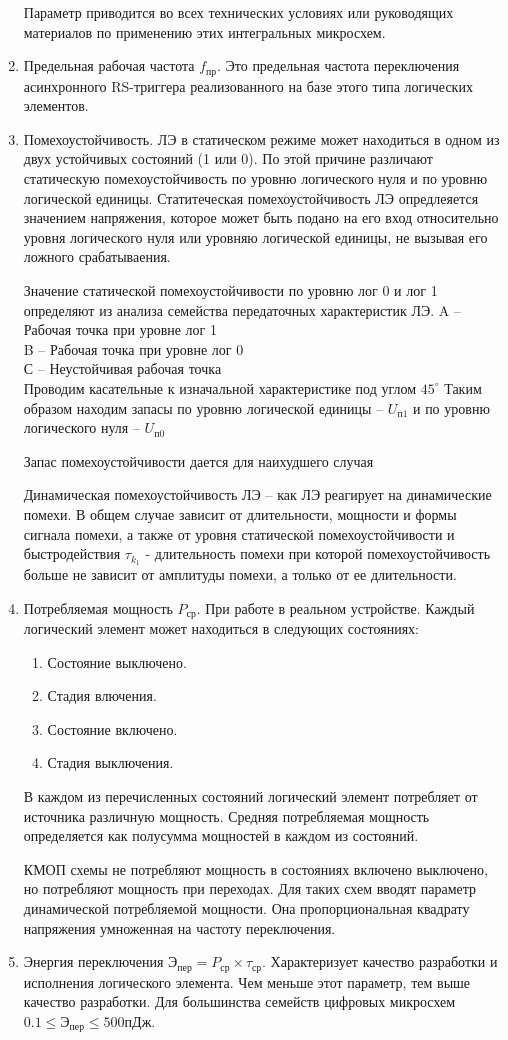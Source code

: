 \documentclass{article}
\begin{document}
\begin{enumerate}
	Параметр приводится во всех технических условиях или руководящих материалов по применению этих интегральных микросхем.
	\item Предельная рабочая частота $f_{пр}$. Это предельная частота переключения асинхронного RS-триггера реализованного на базе этого типа логических
	элементов. 
	\item Помехоустойчивость.
	ЛЭ в статическом режиме может находиться в одном из двух устойчивых состояний (1 или 0). По этой причине различают статическую помехоустойчивость по уровню логического нуля
	и по уровню логической единицы. Статитеческая помехоустойчивость ЛЭ опредлеяется значением напряжения, которое может быть подано на его вход относительно уровня логического
	нуля или уровняю логической единицы, не вызывая его ложного срабатываения.

	Значение статической помехоустойчивости по уровню лог 0 и лог 1 определяют из анализа семейства передаточных характеристик ЛЭ.
	A -- Рабочая точка при уровне лог 1\\
	B -- Рабочая точка при уровне лог 0\\
	С -- Неустойчивая рабочая точка\\
	Проводим касательные к изначальной характеристике под углом $45^{\circ}$
	Таким образом находим запасы по уровню логической единицы -- $U_{п1}$ и по уровню логического нуля -- $U_{п0}$

	Запас помехоустойчивости дается для наихудшего случая
	
	Динамическая помехоустойчивость ЛЭ -- как ЛЭ реагирует на динамические помехи. В общем случае зависит от длительности, мощности и формы сигнала помехи,
	а также от уровня статической помехоустойчивости и быстродействия
	$\tau_{k_1}$ - длительность помехи при которой помехоустойчивость больше не зависит от амплитуды помехи, а только от ее длительности.
	\item Потребляемая мощность $P_{ср}$. При работе в реальном устройстве. Каждый логический элемент может находиться в следующих состояниях:
	\begin{enumerate}
		\item Состояние выключено.
		\item Стадия влючения.
		\item Состояние включено.
		\item Стадия выключения.
	\end{enumerate}
	В каждом из перечисленных состояний логический элемент потребляет от источника различную мощность. Средняя потребляемая мощность определяется как
	полусумма мощностей в каждом из состояний.

	КМОП схемы не потребляют мощность в состояниях включено выключено, но потребляют мощность при переходах. Для таких схем вводят параметр динамической потребляемой мощности.
	Она пропорциональная квадрату напряжения умноженная на частоту переключения.
	\item Энергия переключения $Э_{пер} = P_{ср} \times \tau_{ср}$. Характеризует качество разработки и исполнения логического элемента. Чем меньше этот параметр, тем выше качество разработки.
	Для большинства семейств цифровых микросхем $0.1 \le Э_{пер} \le 500 пДж$.
\end{enumerate}
\end{document}
